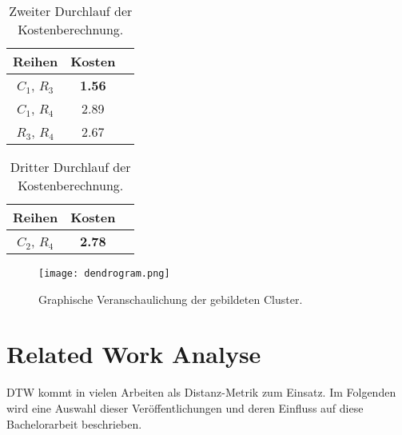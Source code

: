 \begin{table}[ht]
    \begin{center}
        \begin{tabular}{ |c|c|c| } 
         \hline
         Reihen & Kosten \\
         \hline \hline
         $C_{1}$, $R_{3}$ & \textbf{1.56} \\
         \hline
         $C_{1}$, $R_{4}$ & 2.89 \\
         \hline
         $R_{3}$, $R_{4}$ & 2.67 \\
         \hline
        \end{tabular}
        \caption{Zweiter Durchlauf der Kostenberechnung.}
        \label{tbl:ExampleCost2}
    \end{center}
\end{table}
\begin{table}[ht]
    \begin{center}
        \begin{tabular}{ |c|c|c| } 
         \hline
         Reihen & Kosten \\
         \hline \hline
         $C_{2}$, $R_{4}$ & \textbf{2.78} \\
         \hline
        \end{tabular}
        \caption{Dritter Durchlauf der Kostenberechnung.}
        \label{tbl:ExampleCost3}
    \end{center}
\end{table}
\begin{figure}[ht]
    \begin{center}
    \texttt{[image: dendrogram.png]}
    \end{center}
    \caption{Graphische Veranschaulichung der gebildeten Cluster.}
    \label{fig:Dendrogram}
\end{figure}

\clearpage
\section{Related Work Analyse}
\label{3-RelatedWork}
\ac{DTW} kommt in vielen Arbeiten als Distanz-Metrik zum Einsatz.
Im Folgenden wird eine Auswahl dieser Veröffentlichungen und deren Einfluss auf diese Bachelorarbeit beschrieben.

